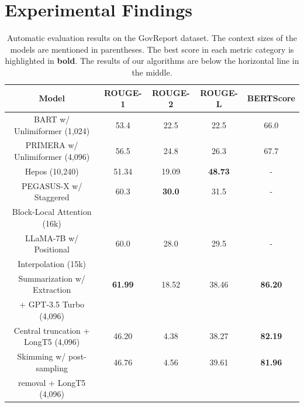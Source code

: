 \section{Experimental Findings}
\label{sec:findings}


\begin{table}[!ht]
  \centering

  \begin{tabular}{c c c c c}
    \hline
    Model & ROUGE-1 & ROUGE-2 & ROUGE-L & BERTScore \\
    \hline
    BART w/ Unlimiformer (1,024) & 53.4 & 22.5 & 22.5 & 66.0 \\
    PRIMERA w/ Unlimiformer (4,096) & 56.5 & 24.8 & 26.3 & 67.7 \\
    Hepos (10,240) & 51.34 & 19.09 & \textbf{48.73} & - \\
    PEGASUS-X w/ Staggered & 60.3 & \textbf{30.0} & 31.5 & - \\
    Block-Local Attention (16k) & & & & \\
    LLaMA-7B w/ Positional & 60.0 & 28.0 & 29.5 & - \\
    Interpolation (15k) & & & & \\
    \hline
    Summarization w/ Extraction & \textbf{61.99} & 18.52 & 38.46 & \textbf{86.20} \\
    + GPT-3.5 Turbo (4,096) & & & & \\
    Central truncation + LongT5 (4,096) & 46.20 & 4.38 & 38.27 & \textbf{82.19} \\
    Skimming w/ post-sampling & 46.76 & 4.56 & 39.61 & \textbf{81.96} \\
    removal + LongT5 (4,096) & & & & \\
    \hline
  \end{tabular}

  \caption{
    Automatic evaluation results on the GovReport dataset. The context sizes of the models are mentioned in parentheses.
    The best score in each metric category is highlighted in \textbf{bold}.
    The results of our algorithms are below the horizontal line in the middle.
  }
  \label{tab:govreport}
\end{table}

